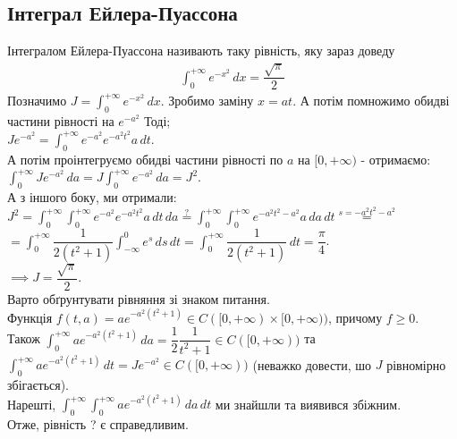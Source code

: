 \documentclass[a4paper, 10pt]{article}
\def\departial#1#2{\dfrac{\partial {#1}}{\partial {#2}}}
\def\huge{\displaystyle}
\theoremstyle{theoremdd}
\theoremstyle{theoremdd}
\theoremstyle{theoremdd}
\theoremstyle{theoremdd}
\theoremstyle{theoremdd}
\theoremstyle{theoremdd}
\theoremstyle{theoremdd}
\theoremstyle{theoremdd}
\theoremstyle{theoremdd}
\begin{document}

\subsection{Інтеграл Ейлера-Пуассона}
Інтегралом Ейлера-Пуассона називають таку рівність, яку зараз доведу
\begin{align*}
\int_0^{+\infty} e^{-x^2}\,dx = \dfrac{\sqrt{\pi}}{2}
\end{align*}
Позначимо $J = \huge \int_0^{+\infty} e^{-x^2}\,dx$. Зробимо заміну $x = at$. А потім помножимо обидві частини рівності на $e^{-a^2}$ Тоді;\\
$Je^{-a^2} = \huge \int_0^{+\infty} e^{-a^2} e^{-a^2 t^2}a \,dt$.\\
А потім проінтегруємо обидві частини рівності по $a$ на $[0,+\infty)$ - отримаємо:\\
$\huge\int_0^{+\infty} Je^{-a^2}\,da = J \int_0^{+\infty} e^{-a^2}\,da = J^2$.\\
А з іншого боку, ми отримали:\\
$J^2 = \huge\int_0^{+\infty} \huge\int_0^{+\infty} e^{-a^2} e^{-a^2t^2} a\,dt \,da \overset{?}{=} \int_0^{+\infty} \int_0^{+\infty} e^{-a^2t^2-a^2} a\,da \,dt \overset{s =-a^2t^2-a^2}{=}$\\
$= \huge \int_0^{+\infty} \dfrac{1}{2(t^2+1)} \int_{-\infty}^0 e^s\,ds\,dt = \int_0^{+\infty} \dfrac{1}{2(t^2+1)}\,dt = \dfrac{\pi}{4}$.\\
$\implies J = \dfrac{\sqrt{\pi}}{2}$.\\
Варто обґрунтувати рівняння зі знаком питання.\\
Функція $f(t,a) = ae^{-a^2(t^2+1)} \in C([0,+\infty) \times [0,+\infty))$, причому $f \geq 0$.\\
Також $\huge\int_0^{+\infty} ae^{-a^2(t^2+1)}\,da = \dfrac{1}{2} \dfrac{1}{t^2+1} \in C([0,+\infty))$ та $\huge\int_0^{+\infty} ae^{-a^2(t^2+1)}\,dt = Je^{-a^2} \in C([0,+\infty))$ (неважко довести, шо $J$ рівномірно збігається).\\
Нарешті, $\huge\int_0^{+\infty} \int_0^{+\infty} ae^{-a^2(t^2+1)}\,da\,dt$ ми знайшли та виявився збіжним.\\
Отже, рівність ? є справедливим.
\end{document}
